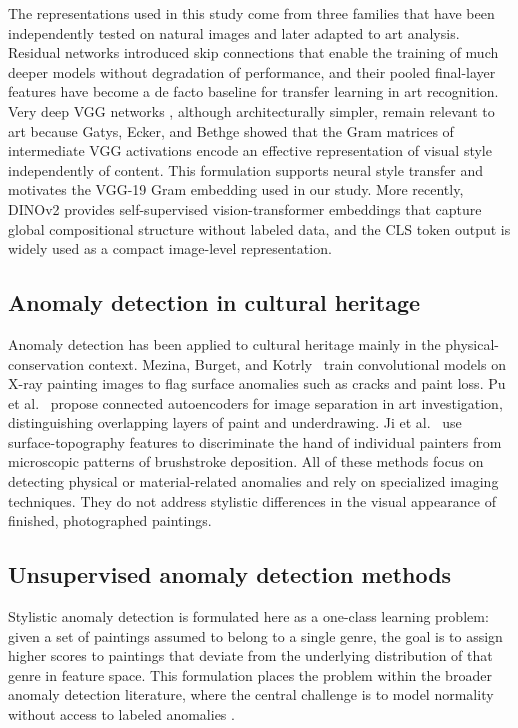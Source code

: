\documentclass[conference]{IEEEtran}
\begin{document}
The representations used in this study come from three families that have been independently tested on natural images and later adapted to art analysis. Residual networks \cite{resnet} introduced skip connections that enable the training of much deeper models without degradation of performance, and their pooled final-layer features have become a de facto baseline for transfer learning in art recognition. Very deep VGG networks \cite{vgg}, although architecturally simpler, remain relevant to art because Gatys, Ecker, and Bethge \cite{gatys} showed that the Gram matrices of intermediate VGG activations encode an effective representation of visual style independently of content. This formulation supports neural style transfer and motivates the VGG-19 Gram embedding used in our study. More recently, DINOv2 \cite{dinov2} provides self-supervised vision-transformer embeddings that capture global compositional structure without labeled data, and the CLS token output is widely used as a compact image-level representation.

\subsection{Anomaly detection in cultural heritage}

Anomaly detection has been applied to cultural heritage mainly in the physical-conservation context. Mezina, Burget, and Kotrly~\cite{mezina} train convolutional models on X-ray painting images to flag surface anomalies such as cracks and paint loss. Pu et al.~\cite{pu} propose connected autoencoders for image separation in art investigation, distinguishing overlapping layers of paint and underdrawing. Ji et al.~\cite{ji} use surface-topography features to discriminate the hand of individual painters from microscopic patterns of brushstroke deposition. All of these methods focus on detecting physical or material-related anomalies and rely on specialized imaging techniques. They do not address stylistic differences in the visual appearance of finished, photographed paintings.

\subsection{Unsupervised anomaly detection methods}

Stylistic anomaly detection is formulated here as a one-class learning problem: given a set of paintings assumed to belong to a single genre, the goal is to assign higher scores to paintings that deviate from the underlying distribution of that genre in feature space. This formulation places the problem within the broader anomaly detection literature, where the central challenge is to model normality without access to labeled anomalies \cite{ruff2018, ruff2021, pang2021}.
\end{document}
